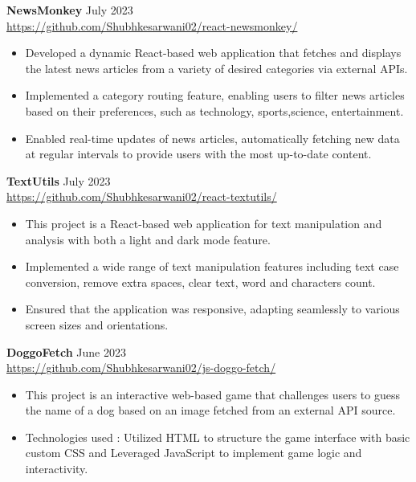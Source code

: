\documentclass[a4paper]{article}
\begin{document}
{\textbf{NewsMonkey}} \hfill July 2023 \\
\vspace{-1mm}
\url{https://github.com/Shubhkesarwani02/react-newsmonkey/} \\
\vspace{-2mm}
\begin{itemize} 
	\item Developed a dynamic React-based web application that fetches and displays the latest news articles from a variety of desired categories via external APIs.
    \item Implemented a category routing feature, enabling users to filter news articles based on their preferences, such as technology, sports,science, entertainment.
    \item Enabled real-time updates of news articles, automatically fetching new data at regular intervals to provide users with the most up-to-date content.
\end{itemize}
{\textbf{TextUtils}} \hfill July 2023 \\
\vspace{-1mm}
\url{https://github.com/Shubhkesarwani02/react-textutils/} \\
\vspace{-2mm}
\begin{itemize} 
	\item This project is a React-based web application for text manipulation and analysis with both a light and dark mode feature.
 \item Implemented a wide range of text manipulation features including text case conversion, remove extra spaces, clear text, word and characters count.
  \item Ensured that the application was responsive, adapting seamlessly to various screen sizes and orientations.
\end{itemize}
{\textbf{DoggoFetch}} \hfill June 2023 \\
\vspace{-1mm}
\url{https://github.com/Shubhkesarwani02/js-doggo-fetch/} \\
\vspace{-2mm}
\begin{itemize} 
    \item This project is an interactive web-based game that challenges users to guess the name of a dog based on an image fetched from an external API source.
     \item Technologies used : Utilized HTML to structure the game interface with basic custom CSS and Leveraged JavaScript to implement game logic and interactivity.
\end{itemize}
\end{document}

